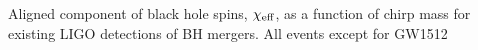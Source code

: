  \label{fig:BHspin} Aligned component of black hole spins, $\chi_{\rm eff}$, as a function of chirp mass for existing LIGO detections of BH mergers. All events except for GW1512